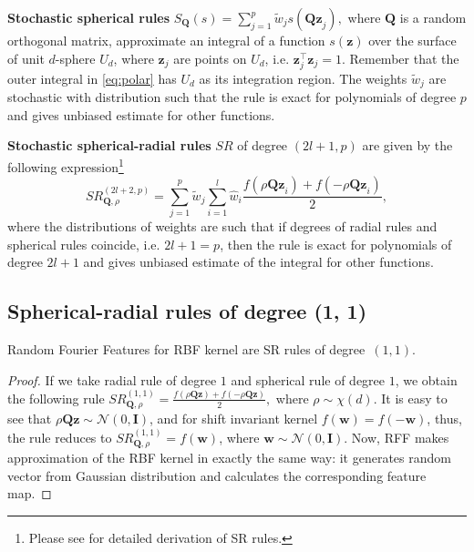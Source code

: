 \textbf{Stochastic spherical rules} ${S_\mathbf{Q}(s) = \sum\limits_{j=1}^{p} \widetilde{w}_j s(\mathbf{Qz}_j),}$ where
$\mathbf{Q}$ is a random orthogonal matrix, approximate an integral of a function $s(\mathbf{z})$ over the surface of unit $d$-sphere $U_d$,
where $\mathbf{z}_j$ are points on $U_d$, i.e. $\mathbf{z}_j^{\boldsymbol{\top}}\mathbf{z}_j = 1$. Remember that the outer integral in \eqref{eq:polar} has $U_d$ as its integration region.
The weights $\widetilde{w}_j$ are stochastic with distribution such that
the rule is exact for polynomials of degree $p$ and gives unbiased estimate
for other functions.

\textbf{Stochastic spherical-radial rules} $SR$ of degree $(2l + 1, p)$ are given by the following expression\footnote{Please see \citep{genz1998stochastic} for detailed derivation of SR rules.}
\[
SR^{(2l + 2, p)}_{\mathbf{Q}, \rho} = \sum_{j = 1}^p \widetilde{w}_j
\sum_{i = 1}^{l} \hat{w}_i \frac{f(\rho\mathbf{Qz}_i) + f(-\rho \mathbf{Qz}_i)}{2},
\]
where the distributions of weights are such that if degrees of radial
rules and spherical rules coincide, i.e. $2l + 1 = p$, then the rule is exact
for polynomials of degree $2l + 1$ and gives unbiased estimate of the integral for other functions.

\subsection{Spherical-radial rules of degree (1, 1)}
\begin{proposition}
Random Fourier Features for RBF kernel are SR rules of degree~$(1, 1)$.
\end{proposition}
\begin{proof}
    If we take radial rule of degree $1$ and spherical rule of degree $1$,
    we obtain the following rule
    $SR^{(1, 1)}_{\mathbf{Q}, \rho} = \frac{f(\rho \mathbf{Qz}) + f(-\rho\mathbf{Qz})}{2},$
    where $\rho \sim \chi(d)$.
    It is easy to see that ${\rho \mathbf{Qz} \sim \mathcal{N}(0, \mathbf{I})}$,
    and for shift invariant kernel ${f(\mathbf{w}) = f(-\mathbf{w})}$, thus, the rule reduces
    to
    ${SR^{(1, 1)}_{\mathbf{Q}, \rho} =
    f(\mathbf{w})}$, where ${\mathbf{w} \sim \mathcal{N}(0, \mathbf{I}).}$
    Now, RFF \citep{rahimi2008random} makes approximation
    of the RBF kernel in exactly the same way: it generates random vector from Gaussian
    distribution and calculates the corresponding feature map.
\end{proof}



